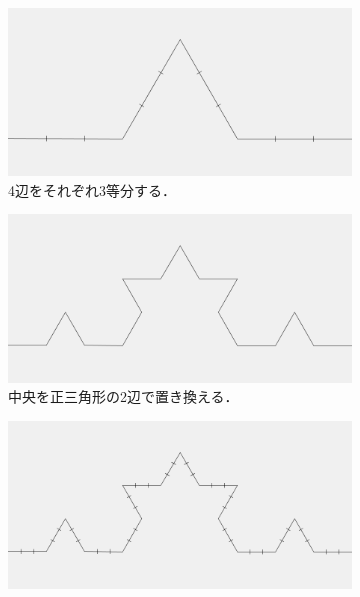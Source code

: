 \documentclass[dvipdfmx]{jsarticle}
\theoremstyle{definition}
\begin{document}
\begin{figure}[H]
    \begin{subfigure}{0.325\textwidth}
        \centering
        \includegraphics[width=\textwidth]{figure/koch/koch_curve1_split.png}
        \caption{4辺をそれぞれ3等分する．}
        \label{fig_proc_kochcurve1_split}
    \end{subfigure}
    \begin{subfigure}{0.325\textwidth}
        \centering
        \includegraphics[width=\textwidth]{figure/koch/koch_curve2.png}
        \caption{中央を正三角形の2辺で置き換える．}
        \label{fig_proc_kochcurve2}
    \end{subfigure}
    \begin{subfigure}{0.325\textwidth}
        \centering
        \includegraphics[width=\textwidth]{figure/koch/koch_curve2_split.png}

\end{subfigure}
\end{figure}
\end{document}
